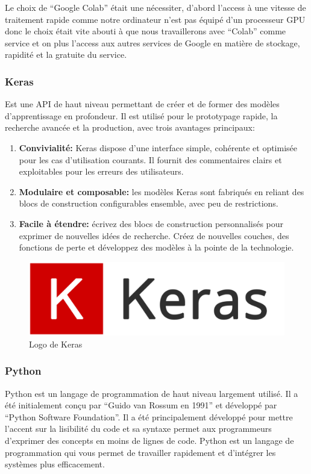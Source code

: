\documentclass[12pt]{article}
\begin{document}
Le choix de “Google Colab” était une nécessiter, d’abord l’access à une vitesse de traitement rapide comme notre ordinateur n’est pas équipé d’un processeur GPU donc le choix était vite abouti à que nous travaillerons avec “Colab” comme service et on plus l’access aux autres services de Google en matière de stockage, rapidité et la gratuite du service.

\subsubsection*{Keras}
Est une API de haut niveau permettant de créer et de former des modèles d'apprentissage en profondeur. Il est utilisé pour le prototypage rapide, la recherche avancée et la production, avec trois avantages principaux:
\begin{enumerate}
	\item \textbf{Convivialité:} Keras dispose d'une interface simple, cohérente et optimisée pour les cas d'utilisation courants. Il fournit des commentaires clairs et exploitables pour les erreurs des utilisateurs.
	\item \textbf{Modulaire et composable:} les modèles Keras sont fabriqués en reliant des blocs de construction configurables ensemble, avec peu de restrictions.
	\item \textbf{Facile à étendre:} écrivez des blocs de construction personnalisés pour exprimer de nouvelles idées de recherche. Créez de nouvelles couches, des fonctions de perte et développez des modèles à la pointe de la technologie.
\end{enumerate}

\begin{figure}[h]
	\centering
	\includegraphics[width=12cm]{img-Chapiter-4/keras.png}
	\caption{Logo de Keras}
\end{figure}

\subsubsection*{Python}
Python est un langage de programmation de haut niveau largement utilisé. Il a été initialement conçu par “Guido van Rossum en 1991” et développé par “Python Software Foundation”. Il a été principalement développé pour mettre l'accent sur la lisibilité du code et sa syntaxe permet aux programmeurs d'exprimer des concepts en moins de lignes de code. Python est un langage de programmation qui vous permet de travailler rapidement et d’intégrer les systèmes plus efficacement.
\end{document}
